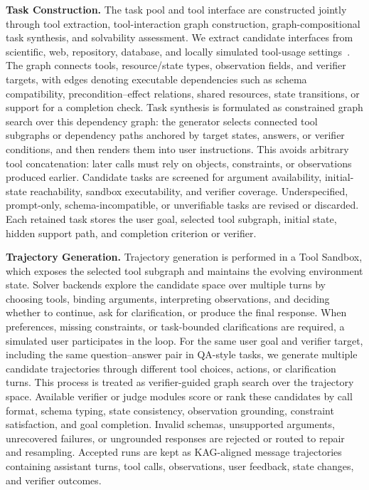 \documentclass{llmxive}
\begin{document}
\textbf{Task Construction.} The task pool and tool interface are constructed jointly through tool extraction, tool-interaction graph construction, graph-compositional task synthesis, and solvability assessment. We extract candidate interfaces from scientific, web, repository, database, and locally simulated tool-usage settings~\citep{barres2025tau2,he2025vitabench}. The graph connects tools, resource/state types, observation fields, and verifier targets, with edges denoting executable dependencies such as schema compatibility, precondition--effect relations, shared resources, state transitions, or support for a completion check. Task synthesis is formulated as constrained graph search over this dependency graph: the generator selects connected tool subgraphs or dependency paths anchored by target states, answers, or verifier conditions, and then renders them into user instructions. This avoids arbitrary tool concatenation: later calls must rely on objects, constraints, or observations produced earlier. Candidate tasks are screened for argument availability, initial-state reachability, sandbox executability, and verifier coverage. Underspecified, prompt-only, schema-incompatible, or unverifiable tasks are revised or discarded. Each retained task stores the user goal, selected tool subgraph, initial state, hidden support path, and completion criterion or verifier.

\textbf{Trajectory Generation.} Trajectory generation is performed in a Tool Sandbox, which exposes the selected tool subgraph and maintains the evolving environment state. Solver backends explore the candidate space over multiple turns by choosing tools, binding arguments, interpreting observations, and deciding whether to continue, ask for clarification, or produce the final response. When preferences, missing constraints, or task-bounded clarifications are required, a simulated user participates in the loop. For the same user goal and verifier target, including the same question--answer pair in QA-style tasks, we generate multiple candidate trajectories through different tool choices, actions, or clarification turns. This process is treated as verifier-guided graph search over the trajectory space. Available verifier or judge modules score or rank these candidates by call format, schema typing, state consistency, observation grounding, constraint satisfaction, and goal completion. Invalid schemas, unsupported arguments, unrecovered failures, or ungrounded responses are rejected or routed to repair and resampling. Accepted runs are kept as KAG-aligned message trajectories containing assistant turns, tool calls, observations, user feedback, state changes, and verifier outcomes.
\end{document}
